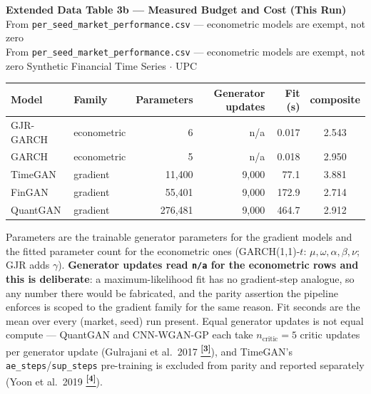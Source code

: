 \documentclass[10pt]{article}
\newcommand{\pagehead}[2]{%
  \begin{tcolorbox}[enhanced,arc=0pt,outer arc=0pt,boxrule=0pt,
    colback=Navy,colframe=Navy,
    top=5pt,bottom=5pt,left=8pt,right=8pt,
    before skip=0pt,after skip=10pt]
  {\color{white}\large\bfseries #1}%
  \ifx\relax#2\relax\else\\[1pt]{\color{blue!30!white}\small #2}\fi
  \hfill{\color{blue!20!white}\footnotesize Synthetic Financial Time Series $\cdot$ UPC}
  \end{tcolorbox}}
\newcommand{\tcite}[1]{%
  \hyperlink{R:#1}{\textsuperscript{\scriptsize\textbf{[#1]}}}}
\begin{document}
\vspace{6pt}
\pagehead{Extended Data Table 3b --- Measured Budget and Cost (This Run)}
         {From \texttt{per\_seed\_market\_performance.csv} --- econometric models are exempt, not zero}

\vspace{4pt}
{\small
\begin{tabular}{@{}llrrrc@{}}
\toprule
Model & Family & Parameters & Generator updates & Fit (s) & composite \\
\midrule
GJR-GARCH & econometric & 6 & n/a & 0.017 & 2.543 \\
GARCH & econometric & 5 & n/a & 0.018 & 2.950 \\
TimeGAN & gradient & 11,400 & 9,000 & 77.1 & 3.881 \\
FinGAN & gradient & 55,401 & 9,000 & 172.9 & 2.714 \\
QuantGAN & gradient & 276,481 & 9,000 & 464.7 & 2.912 \\
\bottomrule
\end{tabular}}

\smallskip
{\small Parameters are the trainable generator parameters for the gradient models and the fitted parameter count for the econometric ones (GARCH(1,1)-$t$: $\mu,\omega,\alpha,\beta,\nu$; GJR adds $\gamma$). \textbf{Generator updates read \texttt{n/a} for the econometric rows and this is deliberate}: a maximum-likelihood fit has no gradient-step analogue, so any number there would be fabricated, and the parity assertion the pipeline enforces is scoped to the gradient family for the same reason. Fit seconds are the mean over every (market, seed) run present. Equal generator updates is not equal compute --- QuantGAN and CNN-WGAN-GP each take $n_\text{critic}=5$ critic updates per generator update (Gulrajani et al.\ 2017\tcite{3}), and TimeGAN's \texttt{ae\_steps}/\texttt{sup\_steps} pre-training is excluded from parity and reported separately (Yoon et al.\ 2019\tcite{4}).}
\end{document}
